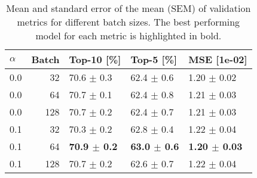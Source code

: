 \begin{table}[h]
\caption{Mean and standard error of the mean (SEM) of validation metrics for different batch sizes. The best performing model for each metric is highlighted in bold.}
\label{tab:batch_size}
\begin{tabular}{lrlll}
\toprule
$\alpha$ & Batch & Top-10 [\%] & Top-5 [\%] & MSE [1e-02] \\
\midrule
0.0 & 32 & 70.6 $\pm$ 0.3 & 62.4 $\pm$ 0.6 & 1.20 $\pm$ 0.02 \\
0.0 & 64 & 70.7 $\pm$ 0.1 & 62.4 $\pm$ 0.8 & 1.21 $\pm$ 0.03 \\
0.0 & 128 & 70.7 $\pm$ 0.2 & 62.4 $\pm$ 0.7 & 1.21 $\pm$ 0.03 \\
0.1 & 32 & 70.3 $\pm$ 0.2 & 62.8 $\pm$ 0.4 & 1.22 $\pm$ 0.04 \\
0.1 & 64 & \textbf{70.9 $\pm$ 0.2} & \textbf{63.0 $\pm$ 0.6} & \textbf{1.20 $\pm$ 0.03} \\
0.1 & 128 & 70.7 $\pm$ 0.2 & 62.6 $\pm$ 0.7 & 1.22 $\pm$ 0.04 \\
\bottomrule
\end{tabular}
\end{table}
